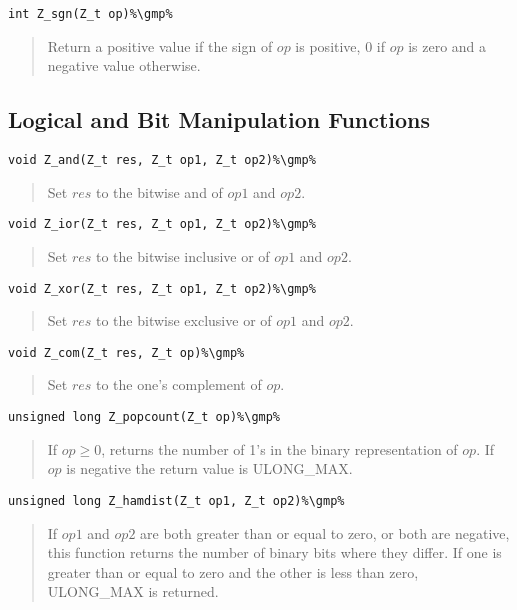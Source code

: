 \documentclass[a4paper,10pt]{article}
\newcommand{\gmp}{\hfill[GMP]}
\begin{document}
\begin{lstlisting}
int Z_sgn(Z_t op)%\gmp%
\end{lstlisting}
\begin{quote}Return a positive value if the sign of $op$ is positive, $0$ if $op$ is zero and a negative value otherwise.\end{quote}

\subsection{Logical and Bit Manipulation Functions}
\begin{lstlisting}
void Z_and(Z_t res, Z_t op1, Z_t op2)%\gmp%
\end{lstlisting}
\begin{quote}Set $res$ to the bitwise and of $op1$ and $op2$.\end{quote}

\begin{lstlisting}
void Z_ior(Z_t res, Z_t op1, Z_t op2)%\gmp%
\end{lstlisting}
\begin{quote}Set $res$ to the bitwise inclusive or of $op1$ and $op2$.\end{quote}

\begin{lstlisting}
void Z_xor(Z_t res, Z_t op1, Z_t op2)%\gmp%
\end{lstlisting}
\begin{quote}Set $res$ to the bitwise exclusive or of $op1$ and $op2$.\end{quote}

\begin{lstlisting}
void Z_com(Z_t res, Z_t op)%\gmp%
\end{lstlisting}
\begin{quote}Set $res$ to the one's complement of $op$.\end{quote}

\begin{lstlisting}
unsigned long Z_popcount(Z_t op)%\gmp%
\end{lstlisting}
\begin{quote}If $op \ge 0$, returns the number of 1's in the binary representation of $op$. If $op$ is negative the return value is ULONG\_MAX.\end{quote}

\begin{lstlisting}
unsigned long Z_hamdist(Z_t op1, Z_t op2)%\gmp%
\end{lstlisting}
\begin{quote}If $op1$ and $op2$ are both greater than or equal to zero, or both are negative, this function returns the number of binary bits where they differ. If one is greater than or equal to zero and the other is less than zero, ULONG\_MAX is returned.\end{quote}
\end{document}
